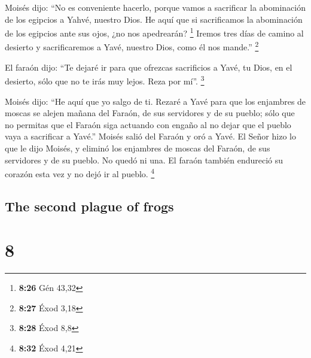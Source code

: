 \begin{paracol}{2}
 Moisés dijo: ``No es conveniente hacerlo, porque vamos a
sacrificar la abominación de los egipcios a Yahvé, nuestro Dios. He aquí
que si sacrificamos la abominación de los egipcios ante sus ojos, ¿no
nos apedrearán? \footnote{\textbf{8:26} Gén 43,32} 
Iremos tres días de camino al desierto y sacrificaremos a Yavé, nuestro
Dios, como él nos mande.'' \footnote{\textbf{8:27} Éxod 3,18}

 El faraón dijo: ``Te dejaré ir para que ofrezcas
sacrificios a Yavé, tu Dios, en el desierto, sólo que no te irás muy
lejos. Reza por mí''. \footnote{\textbf{8:28} Éxod 8,8}

 Moisés dijo: ``He aquí que yo salgo de ti. Rezaré a Yavé
para que los enjambres de moscas se alejen mañana del Faraón, de sus
servidores y de su pueblo; sólo que no permitas que el Faraón siga
actuando con engaño al no dejar que el pueblo vaya a sacrificar a
Yavé.''  Moisés salió del Faraón y oró a Yavé.
 El Señor hizo lo que le dijo Moisés, y eliminó los
enjambres de moscas del Faraón, de sus servidores y de su pueblo. No
quedó ni una.  El faraón también endureció su corazón
esta vez y no dejó ir al pueblo. \footnote{\textbf{8:32} Éxod 4,21}

\switchcolumn
\begin{otherlanguage}{english}

\hypertarget{the-second-plague-of-frogs}{%
\subsection{The second plague of
frogs}\label{the-second-plague-of-frogs}}

\hypertarget{section-15}{%
\section{8}\label{section-15}}


\end{otherlanguage}
\end{paracol}
